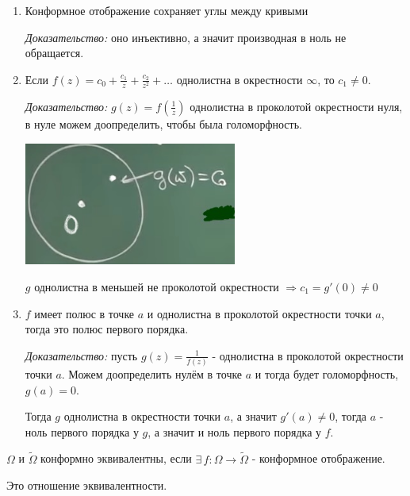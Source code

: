 \begin{consequence}
    \begin{enumerate}
        \item {
            Конформное отображение сохраняет углы между кривыми

            \textit{Доказательство: } оно инъективно, а значит производная в ноль не обращается.
        }
        \item {
            Если $f(z) = c_0 + \frac{c_1}{z} + \frac{c_2}{z^2} + \ldots$ однолистна
            в окрестности $\infty$, то $c_1 \neq 0$.

            \textit{Доказательство: } $g(z) = f(\frac{1}{z})$ однолистна в проколотой окрестности нуля, в нуле можем доопределить, чтобы была голоморфность.

            \begin{center}
                \includegraphics[width=7cm]{assets/04-functions-of-complex-variables/conf-func-consequence-2.jpg}
            \end{center}
            $g$ однолистна в меньшей не проколотой окрестности $\Rightarrow c_1 = g'(0) \neq 0$ 
        }
        \item {
            $f$ имеет полюс в точке $a$ и однолистна в проколотой окрестности точки $a$, 
            тогда это полюс первого порядка.

            \textit{Доказательство: } пусть $g(z) = \frac{1}{f(z)}$ - однолистна в проколотой окрестности точки $a$.
            Можем доопределить нулём в точке $a$ и тогда будет голоморфность, $g(a) = 0$.

            Тогда $g$ однолистна в окрестности точки $a$, а значит $g'(a) \neq 0$, тогда $a$ - 
            ноль первого порядка у $g$, а значит и ноль первого порядка у $f$.
        }
    \end{enumerate}
\end{consequence}

\begin{definition}
    $\Omega$ и $\tilde{\Omega}$ конформно эквивалентны, если $\exists \, f : \Omega \to \tilde{\Omega}$ - конформное отображение.

    \begin{remark}
        Это отношение эквивалентности.
    \end{remark}
\end{definition}

